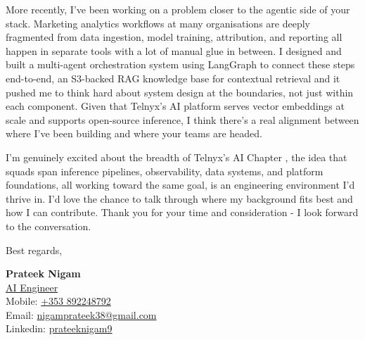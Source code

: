 \documentclass[10.5pt, a4paper]{article}
\begin{document}
More recently, I've been working on a problem closer to the agentic side of your stack. Marketing analytics workflows at many organisations are deeply fragmented from data ingestion, model training, attribution, and reporting all happen in separate tools with a lot of manual glue in between. I designed and built a multi-agent orchestration system using LangGraph to connect these steps end-to-end, an S3-backed RAG knowledge base for contextual retrieval and it pushed me to think hard about system design at the boundaries, not just within each component. Given that Telnyx's AI platform serves vector embeddings at scale and supports open-source inference, I think there's a real alignment between where I've been building and where your teams are headed.

I'm genuinely excited about the breadth of Telnyx's AI Chapter  , the idea that squads span inference pipelines, observability, data systems, and platform foundations, all working toward the same goal, is an engineering environment I'd thrive in. I'd love the chance to talk through where my background fits best and how I can contribute. Thank you for your time and consideration - I look forward to the conversation.

\vspace{1.8em}
Best regards,

\vspace{0.8em}
\textbf{Prateek Nigam} \\
\href{https://prateeknigam.dev/}{AI Engineer} \\
Mobile: \href{tel:+353892248792}{+353 892248792} \\
Email: \href{mailto:nigamprateek38@gmail.com}{nigamprateek38@gmail.com} \\
Linkedin: \href{https://www.linkedin.com/in/prateeknigam9/}{prateeknigam9} \\
\end{document}
